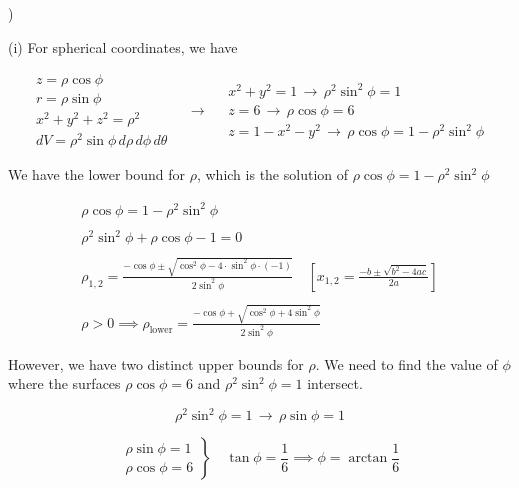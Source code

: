 \documentclass{article}
\begin{document}
\hfill

)

\hfill

\noindent (i) For spherical coordinates, we have

\[
\begin{array}{c}
z=\rho\cos\phi\\
r=\rho\sin\phi\\
x^2+y^2+z^2=\rho^2\\
dV=\rho^2\sin\phi\,d\rho\,d\phi\,d\theta
\end{array}\quad\rightarrow\quad
\begin{array}{c}
x^2+y^2=1\,\rightarrow\,\rho^2\sin^2\phi = 1\\
z=6\,\rightarrow\,\rho\cos\phi=6\\
z=1-x^2-y^2\,\rightarrow\,\rho\cos\phi=1-\rho^2\sin^2\phi
\end{array}
\]

\hfill

\noindent We have the lower bound for $\rho$, which is the solution of $\rho\cos\phi=1-\rho^2\sin^2\phi$

\[
\begin{array}{c}
\rho\cos\phi=1-\rho^2\sin^2\phi\\\\
\rho^2\sin^2\phi+\rho\cos\phi-1=0\\\\
\displaystyle \rho_{1,2} = \frac{-\cos\phi \pm\sqrt{\cos^2\phi-4\cdot\sin^2\phi\cdot(-1)}}{2\sin^2\phi}\quad\left[x_{1,2}=\frac{-b\pm\sqrt{b^2-4ac}}{2a}\right]\\\\
\displaystyle \rho>0\implies\rho_{\text{lower}}=\frac{-\cos\phi +\sqrt{\cos^2\phi+4\sin^2\phi}}{2\sin^2\phi}
\end{array}
\]

\hfill

\noindent However, we have two distinct upper bounds for $\rho$. We need to find the value of $\phi$ where the surfaces $\rho\cos\phi = 6$ and $\rho^2\sin^2\phi=1$ intersect.

\begin{equation*}
\rho^2\sin^2\phi=1 \,\rightarrow\,\rho\sin\phi = 1
\end{equation*}

\[
\left.
\begin{array}{c}
\rho\sin\phi=1\\
\rho\cos\phi=6
\end{array}
\right\}\quad\tan\phi=\frac16\implies\phi=\arctan{\frac16}
\]
\end{document}
